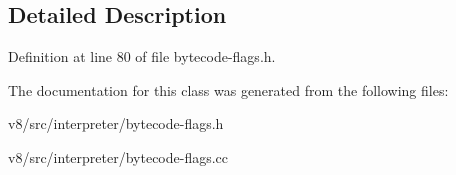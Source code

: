 \subsection{Detailed Description}


Definition at line 80 of file bytecode-\/flags.\+h.



The documentation for this class was generated from the following files\+:\begin{DoxyCompactItemize}
\item 
v8/src/interpreter/bytecode-\/flags.\+h\item 
v8/src/interpreter/bytecode-\/flags.\+cc\end{DoxyCompactItemize}
